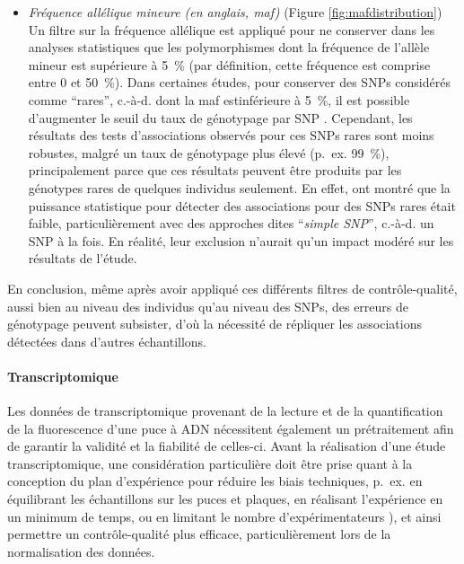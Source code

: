\documentclass[11pt,a4paper,notrimn]{krantz}
\providecommand{\tightlist}{%
  \setlength{\itemsep}{0pt}\setlength{\parskip}{0pt}}
\let\oldparagraph\paragraph
\renewcommand{\paragraph}[1]{\oldparagraph{#1}\mbox{}}
\theoremstyle{definition}
\theoremstyle{definition}
\theoremstyle{remark}
\begin{document}
\begin{itemize}
\tightlist
\item
  \emph{Fréquence allélique mineure (en anglais, maf)} (Figure
  \ref{fig:mafdistribution})\\
  Un filtre sur la fréquence allélique est appliqué pour ne conserver
  dans les analyses statistiques que les polymorphismes dont la
  fréquence de l'allèle mineur est supérieure à 5~\% (par définition,
  cette fréquence est comprise entre 0 et 50~\%). Dans certaines études,
  pour conserver des SNPs considérés comme ``rares'', c.-à-d. dont la
  maf estinférieure à 5~\%, il est possible d'augmenter le seuil du taux
  de génotypage par SNP \citep{burton_genome-wide_2007}. Cependant, les
  résultats des tests d'associations observés pour ces SNPs rares sont
  moins robustes, malgré un taux de génotypage plus élevé (p.~ex.
  99~\%), principalement parce que ces résultats peuvent être produits
  par les génotypes rares de quelques individus seulement. En effet,
  \citet{morris_evaluation_2010} ont montré que la puissance statistique
  pour détecter des associations pour des SNPs rares était faible,
  particulièrement avec des approches dites ``\emph{simple SNP}'',
  c.-à-d. un SNP à la fois. En réalité, leur exclusion n'aurait qu'un
  impact modéré sur les résultats de l'étude.
\end{itemize}

En conclusion, même après avoir appliqué ces différents filtres de
contrôle-qualité, aussi bien au niveau des individus qu'au niveau des
SNPs, des erreurs de génotypage peuvent subsister, d'où la nécessité de
répliquer les associations détectées dans d'autres échantillons.

\clearpage

\paragraph{Transcriptomique}\label{transcriptomiquePT}

Les données de transcriptomique provenant de la lecture et de la
quantification de la fluorescence d'une puce à ADN nécessitent également
un prétraitement afin de garantir la validité et la fiabilité de
celles-ci. Avant la réalisation d'une étude transcriptomique, une
considération particulière doit être prise quant à la conception du plan
d'expérience pour réduire les biais techniques, p.~ex. en équilibrant
les échantillons sur les puces et plaques, en réalisant l'expérience en
un minimum de temps, ou en limitant le nombre d'expérimentateurs
\citep{quackenbush_microarray_2002}), et ainsi permettre un
contrôle-qualité plus efficace, particulièrement lors de la
normalisation des données.
\end{document}
